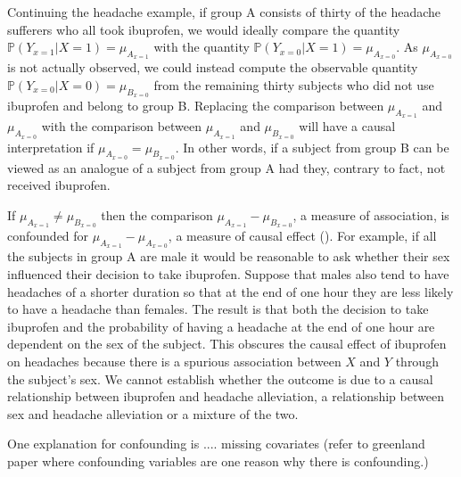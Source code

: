 \documentclass[11pt]{article}
\begin{document}
Continuing the headache example, if group A consists of thirty of the
headache sufferers who all took ibuprofen, we would ideally compare the
quantity \(\mathbb{P}(Y_{x = 1}|X = 1) = \mu_{A_{x = 1}}\) with the
quantity \(\mathbb{P}(Y_{x = 0}|X = 1) = \mu_{A_{x = 0}}\). As
\(\mu_{A_{x = 0}}\) is not actually observed, we could instead compute
the observable quantity \(\mathbb{P}(Y_{x = 0}|X = 0) = \mu_{B_{x=0}}\)
from the remaining thirty subjects who did not use ibuprofen and belong
to group B. Replacing the comparison between \(\mu_{A_{x = 1}}\) and
\(\mu_{A_{x = 0}}\) with the comparison between \(\mu_{A_{x = 1}}\) and
\(\mu_{B_{x=0}}\) will have a causal interpretation if
\(\mu_{A_{x = 0}} = \mu_{B_{x=0}}\). In other words, if a subject from
group B can be viewed as an analogue of a subject from group A had they,
contrary to fact, not received ibuprofen. \linebreak

If \(\mu_{A_{x = 1}} \neq \mu_{B_{x=0}}\) then the comparison
\(\mu_{A_{x = 1}} - \mu_{B_{x=0}}\), a measure of association, is
confounded for \(\mu_{A_{x = 1}} - \mu_{A_{x = 0}}\), a measure of
causal effect (\citet{Greenland1999}). For example, if all the subjects
in group A are male it would be reasonable to ask whether their sex
influenced their decision to take ibuprofen. Suppose that males also
tend to have headaches of a shorter duration so that at the end of one
hour they are less likely to have a headache than females. The result is
that both the decision to take ibuprofen and the probability of having a
headache at the end of one hour are dependent on the sex of the subject.
This obscures the causal effect of ibuprofen on headaches because there
is a spurious association between \(X\) and \(Y\) through the subject's
sex. We cannot establish whether the outcome is due to a causal
relationship between ibuprofen and headache alleviation, a relationship
between sex and headache alleviation or a mixture of the two. \linebreak

One explanation for confounding is .... missing covariates (refer to
greenland paper where confounding variables are one reason why there is
confounding.)
\end{document}
